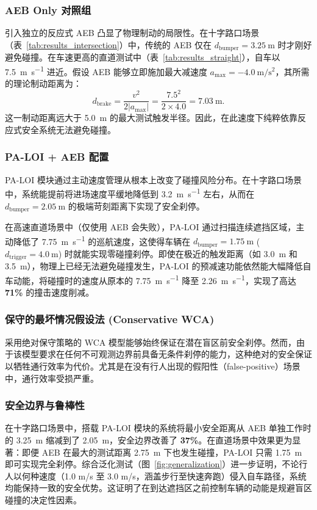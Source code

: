 \documentclass[conference]{IEEEtran}
\begin{document}
\subsubsection{AEB Only 对照组}\label{aeb-only-ux5bf9ux7167ux7ec4}
引入独立的反应式 AEB 凸显了物理制动的局限性。在十字路口场景（表~\ref{tab:results_intersection}）中，传统的 AEB 仅在 $d_{\text{bumper}} = \SI{3.25}{\meter}$ 时才刚好避免碰撞。在车速更高的直道测试中（表~\ref{tab:results_straight}），自车以 \SI{7.5}{\meter\per\second} 进近。假设 AEB 能够立即施加最大减速度 $a_{\text{max}} = \SI{-4.0}{\meter\per\second\squared}$，其所需的理论制动距离为：
\begin{equation}
    d_{\text{brake}} = \frac{v^2}{2|a_{\text{max}}|} = \frac{7.5^2}{2 \times 4.0} = \SI{7.03}{\meter}.
\end{equation}
这一制动距离远大于 \SI{5.0}{\meter} 的最大测试触发半径。因此，在此速度下纯粹依靠反应式安全系统无法避免碰撞。

\subsubsection{PA-LOI + AEB 配置}
PA-LOI 模块通过主动速度管理从根本上改变了碰撞风险分布。在十字路口场景中，系统能提前将进场速度平缓地降低到 \SI{3.2}{\meter\per\second} 左右，从而在 $d_{\text{bumper}} = \SI{2.05}{\meter}$ 的极端苛刻距离下实现了安全刹停。

在高速直道场景中（仅使用 AEB 会失败），PA-LOI 通过扫描连续遮挡区域，主动降低了 \SI{7.75}{\meter\per\second} 的巡航速度，这使得车辆在 $d_{\text{bumper}} = \SI{1.75}{\meter}$ ($d_{\text{trigger}} = \SI{4.0}{\meter}$) 时就能实现零碰撞刹停。即使在极近的触发距离（如 \SI{3.0}{\meter} 和 \SI{3.5}{\meter}），物理上已经无法避免碰撞发生，PA-LOI 的预减速功能依然能大幅降低自车动能，将碰撞时的速度从原本的 \SI{7.75}{\meter\per\second} 降至 \SI{2.26}{\meter\per\second}，实现了高达 \textbf{71\%} 的撞击速度削减。

\subsubsection{保守的最坏情况假设法 (Conservative WCA)}
采用绝对保守策略的 WCA 模型能够始终保证在潜在盲区前安全刹停。然而，由于该模型要求在任何不可观测边界前具备无条件刹停的能力，这种绝对的安全保证以牺牲通行效率为代价。尤其是在没有行人出现的假阳性（false-positive）场景中，通行效率受损严重。

\subsubsection{安全边界与鲁棒性}
在十字路口场景中，搭载 PA-LOI 模块的系统将最小安全距离从 AEB 单独工作时的 \SI{3.25}{\meter} 缩减到了 \SI{2.05}{\meter}，安全边界改善了 \textbf{37\%}。在直道场景中效果更为显著：即便 AEB 在最大的测试距离 \SI{2.75}{\meter} 下也发生碰撞，PA-LOI 只需 \SI{1.75}{\meter} 即可实现完全刹停。综合泛化测试（图~\ref{fig:generalization}）进一步证明，不论行人以何种速度（1.0 m/s 至 3.0 m/s，涵盖步行至快速奔跑）侵入自车路径，系统均能保持一致的安全优势。这证明了在到达遮挡区之前控制车辆的动能是规避盲区碰撞的决定性因素。
\end{document}
